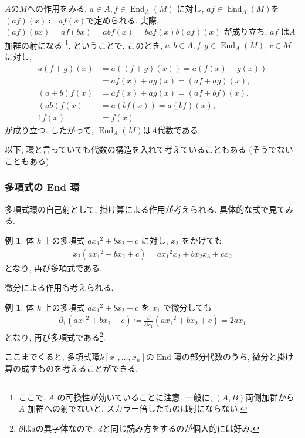 \documentclass[11pt, a4paper, dvipdfmx]{jsarticle}
\theoremstyle{definition}
\newtheorem{Example}[Axiom]{例}
\newcommand{\p}{\partial}
\newcommand{\End}{\mathop{\mathrm{End}}\nolimits}
\numberwithin{equation}{section}
\begin{document}
$A$の$M$への作用をみる. 
$a\in A, f\in\End_A(M)$ に対し, $af\in\End_A(M)$を
$(af)(x) \coloneqq af(x)$で定められる. 
実際, 
$(af)(bx) = af(bx) =abf(x) = baf(x) b(af)(x)$
が成り立ち, $af$ は$A$加群の射になる
\footnote{
    ここで, $A$ の可換性が効いていることに注意. 
    一般に, $(A,B)$両側加群から$A$ 加群への射でないと, 
    スカラー倍したものは射にならない.}. 
ということで, このとき, 
$a,b\in A, f,g\in\End_A(M), x\in M$ に対し, 
\begin{align*}
    a(f+g)(x) &= a((f+g)(x)) = a(f(x)+g(x)) \\
    &= af(x) + ag(x) = (af+ag)(x), \\
    (a+b)f(x) &= af(x) + ag(x) = (af+bf)(x), \\
    (ab)f(x) &= a(bf(x)) = a(bf)(x), \\
    1f(x) &= f(x)
\end{align*}
が成り立つ. 
したがって, $\End_A(M)$は$A$代数である. 

以下, 環と言っていても代数の構造を入れて考えていることもある 
(そうでないこともある). 

\subsubsection*{多項式の End 環}

多項式環の自己射として, 掛け算による作用が考えられる. 
具体的な式で見てみる. 

\begin{Example}
    体 $k$ 上の多項式 $a{x_1}^2 + bx_2 + c$ に対し, 
    $x_2$ をかけても
    \begin{align*}
        x_2(a{x_1}^2 + bx_2 + c) 
        = a{x_1}^2x_2 + bx_2x_3 + cx_2
    \end{align*}
    となり, 再び多項式である. 
\end{Example}

微分による作用も考えられる. 

\begin{Example}
    体 $k$ 上の多項式 $a{x_1}^2 + bx_2 + c$ を
    $x_1$ で微分しても
    \begin{align*}
        \p_1(a{x_1}^2 + bx_2 + c)
        \coloneqq \frac{\p}{\p x_1}(a{x_1}^2 + bx_2 + c)
        = 2a{x_1}
    \end{align*}
    となり, 再び多項式である\footnote{
        $\p$は$d$の異字体なので, $d$と同じ読み方をするのが個人的には好み. 
    }. 
\end{Example}

ここまでくると, 
多項式環$k[x_1,\ldots,x_n]$の$\End$環の部分代数のうち, 
微分と掛け算の成すものを考えることができる. 
\end{document}
